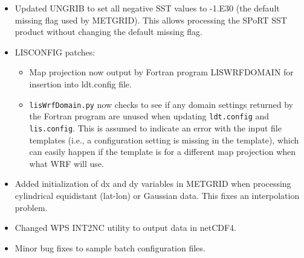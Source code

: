 \begin{itemize}
\begin{itemize}
    \item Updated UNGRIB to set all negative SST values to -1.E30 (the default
      missing flag used by METGRID).  This allows processing the SPoRT SST
      product without changing the default missing flag.
    \item LISCONFIG patches:
      \begin{itemize}
      \item Map projection now output by Fortran program LISWRFDOMAIN for 
        insertion into ldt.config file.
      \item \texttt{lisWrfDomain.py} now checks to see if any domain settings
        returned by the Fortran program are unused when updating 
        \texttt{ldt.config} and \texttt{lis.config}.  This is assumed to 
        indicate an error with the input file templates (i.e., a configuration
        setting is missing in the template), which can easily happen if the 
        template is for a different map projection when what WRF will use.
      \end{itemize}
    \item Added initialization of dx and dy variables in METGRID when
      processing cylindrical equidistant (lat-lon) or Gaussian data.  This
      fixes an interpolation problem.
    \item Changed WPS INT2NC utility to output data in netCDF4.
    \item Minor bug fixes to sample batch configuration files.
  \end{itemize}


\end{itemize}
